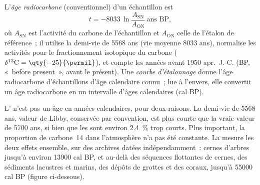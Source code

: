 \begin{definition}\label{def:b1:radiometric-methods:radiocarbon}
L'\emph{âge radiocarbone} (conventionnel) d'un échantillon est
\[
  t = -8033 \,\ln \frac{A_{\mathrm{SN}}}{A_{\mathrm{ON}}} \ \text{ans BP},
\]
où $A_{\mathrm{SN}}$ est l'activité du carbone de l'échantillon et
$A_{\mathrm{ON}}$ celle de l'étalon de référence~; il utilise la demi-vie de
\num{5568} ans (vie moyenne \num{8033} ans), normalise les activités pour
le fractionnement isotopique du carbone ($\delta^{13}\mathrm{C} = \qty{-25}{\permil}$),
et compte les années avant 1950 apr.~J.-C. (BP, «~before present~», avant le présent). Une
\emph{courbe d'étalonnage} donne l'âge radiocarbone
d'échantillons d'âge calendaire connu~; lue à l'envers, elle convertit un âge radiocarbone en
un intervalle d'âges calendaires (cal BP).
\end{definition}

L' n'est pas un âge en années calendaires, pour deux raisons. La
demi-vie de \num{5568} ans, valeur de Libby, conservée par convention, est plus courte que la vraie valeur de \num{5700} ans, si bien que les  sont
environ \qty{2.4}{\percent} trop courts. Plus important, la proportion de carbone~14 dans
l'atmosphère n'a pas été constante. La  mesure les deux effets
ensemble, sur des archives datées indépendamment~: cernes d'arbres jusqu'à environ
\num{13900} cal BP, et au-delà des séquences flottantes de cernes, des sédiments lacustres et
marins, des dépôts de grottes et des coraux, jusqu'à \num{55000} cal BP (figure ci-dessous).


